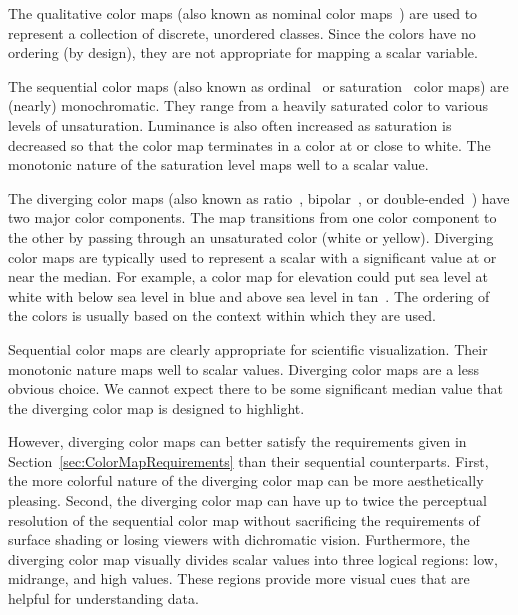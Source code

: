\documentclass[review,journal]{vgtc}         %
\newcommand{\lcite}[1]{~\cite{#1}}
\begin{document}
The qualitative color maps (also known as nominal color maps\lcite{Ware04})
are used to represent a collection of discrete, unordered classes.  Since
the colors have no ordering (by design), they are not appropriate for
mapping a scalar variable.

The sequential color maps (also known as ordinal\lcite{Ware04} or
saturation\lcite{Rheingans99} color maps) are (nearly) monochromatic.  They
range from a heavily saturated color to various levels of unsaturation.
Luminance is also often increased as saturation is decreased so that the
color map terminates in a color at or close to white.  The monotonic nature
of the saturation level maps well to a scalar value.

The diverging color maps (also known as ratio\lcite{Ware04},
bipolar\lcite{Spence01}, or double-ended\lcite{Rheingans99}) have two major
color components.  The map transitions from one color component to the
other by passing through an unsaturated color (white or yellow).  Diverging
color maps are typically used to represent a scalar with a significant
value at or near the median.  For example, a color map for elevation could
put sea level at white with below sea level in blue and above sea level in
tan\lcite{Tufte97}.  The ordering of the colors is usually based on the
context within which they are used.

Sequential color maps are clearly appropriate for scientific visualization.
Their monotonic nature maps well to scalar values.  Diverging color maps
are a less obvious choice.  We cannot expect there to be some significant
median value that the diverging color map is designed to highlight.

However, diverging color maps can better satisfy the requirements given in
Section~\ref{sec:ColorMapRequirements} than their sequential counterparts.
First, the more colorful nature of the diverging color map can be more
aesthetically pleasing.  Second, the diverging color map can have up to
twice the perceptual resolution of the sequential color map without
sacrificing the requirements of surface shading or losing viewers
with dichromatic vision.  Furthermore, the diverging color map visually
divides scalar values into three logical regions: low, midrange, and high
values.  These regions provide more visual cues that are helpful for
understanding data.
\end{document}
